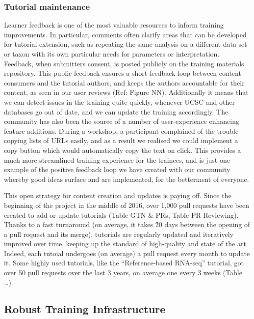 \documentclass[10pt,letterpaper]{article}
\begin{document}
\subsubsection*{Tutorial maintenance}
Learner feedback is one of the most valuable resources to inform training improvements.
In particular, comments often clarify areas that can be developed for tutorial extension, such as repeating the same analysis on a different data set or taxon with its own particular needs for parameters or interpretation.
Feedback, when submitters consent, is posted publicly on the training materials repository.
This public feedback ensures a short feedback loop between content consumers and the tutorial authors, and keeps the authors accountable for their content, as seen in our user reviews (Ref: Figure NN).
Additionally it means that we can detect issues in the training quite quickly, whenever UCSC and other databases go out of date, and we can update the training accordingly.
The community has also been the source of a number of user-experience enhancing feature additions.
During a workshop, a participant complained of the trouble copying lists of URLs easily, and as a result we realised we could implement a copy button which would automatically copy the text on click.
This provides a much more streamlined training experience for the trainees, and is just one example of the positive feedback loop we have created with our community whereby good ideas surface and are implemented, for the betterment of everyone.


This open strategy for content creation and updates is paying off.
Since the beginning of the project in the middle of 2016, over 1,000 pull requests have been created to add or update tutorials (Table GTN \& PRs, Table PR Reviewing).
Thanks to a fast turnaround (on average, it takes \~20 days between the opening of a pull request and its merge), tutorials are regularly updated and iteratively improved over time, keeping up the standard of high-quality and state of the art.
Indeed, each tutoial undergoes (on average) a pull request every month to update it. Some highly used tutorials, like the “Reference-based RNA-seq” tutorial, got over 50 pull requests over the last 3 years, on average one every 3 weeks (Table …).



\subsection*{Robust Training Infrastructure}
\end{document}

